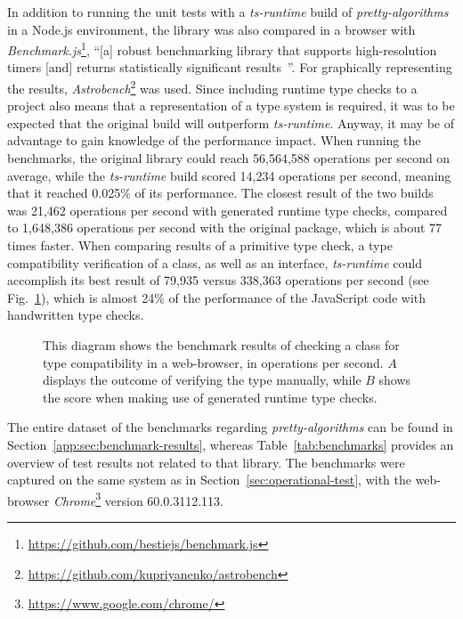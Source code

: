 In addition to running the unit tests with a \emph{ts-runtime} build of \emph{pretty-algorithms} in a Node.js environment, the library was also compared in a browser with \emph{Benchmark.js}\footnote{\url{https://github.com/bestiejs/benchmark.js}}, ``[a] robust benchmarking library that supports high-resolution timers [and] returns statistically significant results~\cite{Evaluation:benchmarkjs}''. For graphically representing the results, \emph{Astrobench}\footnote{\url{https://github.com/kupriyanenko/astrobench}} was used. Since including runtime type checks to a project also means that a representation of a type system is required, it was to be expected that the original build will outperform \emph{ts-runtime}. Anyway, it may be of advantage to gain knowledge of the performance impact. When running the benchmarks, the original library could reach 56,564,588 operations per second on average, while the \emph{ts-runtime} build scored 14,234 operations per second, meaning that it reached 0.025\% of its performance. The closest result of the two builds was 21,462 operations per second with generated runtime type checks, compared to 1,648,386 operations per second with the original package, which is about 77 times faster. When comparing results of a primitive type check, a type compatibility verification of a class, as well as an interface, \emph{ts-runtime} could accomplish its best result of 79,935 versus 338,363 operations per second (see Fig.~\ref{fig:benchmark}), which is almost 24\% of the performance of the JavaScript code with handwritten type checks.
\begin{figure}
\centering

\caption{This diagram shows the benchmark results of checking a class for type compatibility in a web-browser, in operations per second. $A$ displays the outcome of verifying the type manually, while $B$ shows the score when making use of generated runtime type checks.}
\label{fig:benchmark}
\end{figure}
The entire dataset of the benchmarks regarding \emph{pretty-algorithms} can be found in Section~\ref{app:sec:benchmark-results}, whereas Table~\ref{tab:benchmarks} provides an overview of test results not related to that library. The benchmarks were captured on the same system as in Section~\ref{sec:operational-test}, with the web-browser \emph{Chrome}\footnote{\url{https://www.google.com/chrome/}} version 60.0.3112.113.
